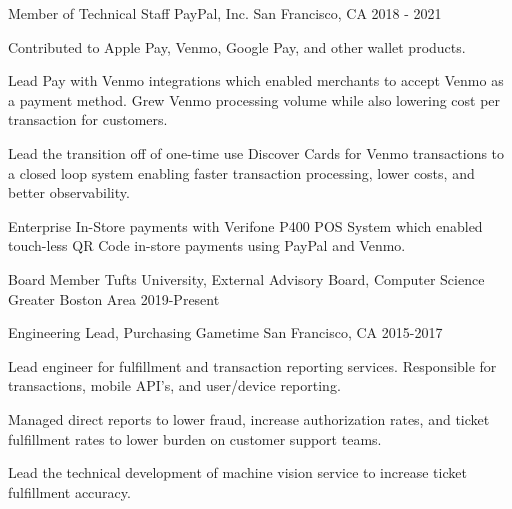 
\begin{cventries}

  \cventry
    {Member of Technical Staff} %
    {PayPal, Inc.} %
    {San Francisco, CA} %
    {2018 - 2021} %
    {
      \begin{cvitems} %
        \item {Contributed to Apple Pay, Venmo, Google Pay, and other wallet products.}
        \item {Lead Pay with Venmo integrations which enabled merchants to accept Venmo as a payment method. Grew Venmo processing volume while also lowering cost per transaction for customers.}
        \item {Lead the transition off of one-time use Discover Cards for Venmo transactions to a closed loop system enabling faster transaction processing, lower costs, and better observability.}
        \item {Enterprise In-Store payments with Verifone P400 POS System which enabled touch-less QR Code in-store payments using PayPal and Venmo.}
      \end{cvitems}
    }

  \cventry
    {Board Member} %
    {Tufts University, External Advisory Board, Computer Science} %
    {Greater Boston Area} %
    {2019-Present} %
    {
      \begin{cvitems} %
      \end{cvitems}
    }

  \cventry
    {Engineering Lead, Purchasing} %
    {Gametime} %
    {San Francisco, CA} %
    {2015-2017} %
    {
      \begin{cvitems} %
        \item {Lead engineer for fulfillment and transaction reporting services. Responsible for transactions, mobile API's, and user/device reporting.}
        \item {Managed direct reports to lower fraud, increase authorization rates, and ticket fulfillment rates to lower burden on customer support teams.}
        \item {Lead the technical development of machine vision service to increase ticket fulfillment accuracy.}
      \end{cvitems}
    }


\end{cventries}
